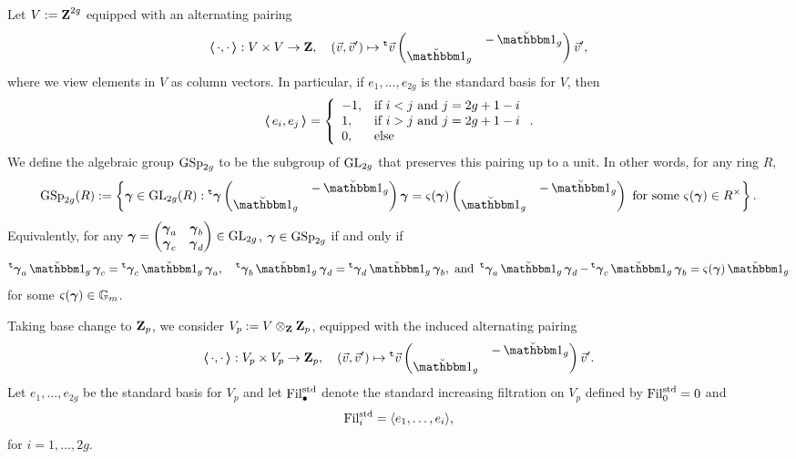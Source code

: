 Let $V:=\operatorname{\mathbf{Z}}^{2g}$ equipped with an alternating pairing $$\bla\cdot, \cdot\bra:V\times V\rightarrow \Z, \quad (\vec{v}, \vec{v}')\mapsto \trans\vec{v}\begin{pmatrix} & -\oneanti_g\\ \oneanti_g & \end{pmatrix}\vec{v}',$$ where we view elements in $V$ as column vectors. In particular, if $e_1, ..., e_{2g}$ is the standard basis for $V$, then $$\operatorname{\boldsymbol{\langle}} e_i, e_j\operatorname{\boldsymbol{\rangle}}=\left\{\begin{array}{ll}
    -1, & \text{if }i<j\text{ and } j=2g+1-i\\
    1, & \text{if }i>j\text{ and }j=2g+1-i\\
    0, & \text{else}
\end{array}\right. .$$ We define the algebraic group $\operatorname{GSp}_{2g}$ to be the subgroup of $\operatorname{GL}_{2g}$ that preserves this pairing up to a unit. In other words, for any ring $R$, $$\GSp_{2g}(R):=\left\{\bfgamma\in \GL_{2g}(R): \trans\bfgamma \begin{pmatrix} & -\oneanti_g\\ \oneanti_g\end{pmatrix}\bfgamma = \varsigma(\bfgamma)\begin{pmatrix} & -\oneanti_g\\ \oneanti_g\end{pmatrix}\text{ for some }\varsigma(\bfgamma)\in R^{\times}\right\}.$$ Equivalently, for any $\operatorname{\boldsymbol{\gamma}}=\begin{pmatrix}\operatorname{\boldsymbol{\gamma}}_a & \operatorname{\boldsymbol{\gamma}}_b\\ \operatorname{\boldsymbol{\gamma}}_c & \operatorname{\boldsymbol{\gamma}}_d\end{pmatrix}\in \operatorname{GL}_{2g}$, $\operatorname{\boldsymbol{\gamma}}\in \operatorname{GSp}_{2g}$ if and only if 
$$\trans\bfgamma_a\oneanti_g\bfgamma_c=\trans\bfgamma_c\oneanti_g\bfgamma_a, \quad \trans\bfgamma_b\oneanti_g\bfgamma_d=\trans\bfgamma_d\oneanti_g\bfgamma_b, \text{ and }\trans\bfgamma_a\oneanti_g\bfgamma_d-\trans\bfgamma_c\oneanti_g\bfgamma_b=\varsigma(\bfgamma)\oneanti_g$$ for some $\varsigma(\operatorname{\boldsymbol{\gamma}})\in \operatorname{\mathbb{G}}_m$.

Taking base change to $\operatorname{\mathbf{Z}}_p$, we consider $V_p:=V\otimes_{\operatorname{\mathbf{Z}}}\operatorname{\mathbf{Z}}_p$, equipped with the induced alternating pairing
$$\bla\cdot, \cdot\bra:V_p\times V_p\rightarrow \Z_p, \quad (\vec{v}, \vec{v}')\mapsto \trans\vec{v}\begin{pmatrix} & -\oneanti_g\\ \oneanti_g & \end{pmatrix}\vec{v}'.$$ Let $e_1, \ldots, e_{2g}$ be the standard basis for $V_p$ and let $\operatorname{Fil}^{\operatorname{std}}_{\bullet}$ denote the standard increasing filtration on $V_p$ defined by $\operatorname{Fil}^{\operatorname{std}}_0=0$ and $$\operatorname{Fil}^{\operatorname{std}}_i=\langle e_1, \ldots, e_i\rangle,$$ for $i=1, \ldots, 2g$.

